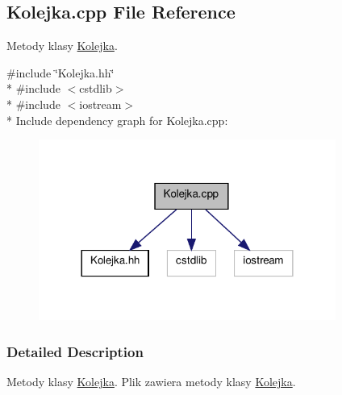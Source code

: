 \hypertarget{a00007}{\subsection{Kolejka.\-cpp File Reference}
\label{a00007}
}


Metody klasy \hyperlink{a00002}{Kolejka}.  


{\ttfamily \#include \char`\"{}Kolejka.\-hh\char`\"{}}\\*
{\ttfamily \#include $<$cstdlib$>$}\\*
{\ttfamily \#include $<$iostream$>$}\\*
Include dependency graph for Kolejka.\-cpp\-:\nopagebreak
\begin{figure}[H]
\begin{center}
\leavevmode
\includegraphics[width=276pt]{a00018}
\end{center}
\end{figure}


\subsubsection{Detailed Description}
Metody klasy \hyperlink{a00002}{Kolejka}. Plik zawiera metody klasy \hyperlink{a00002}{Kolejka}. 